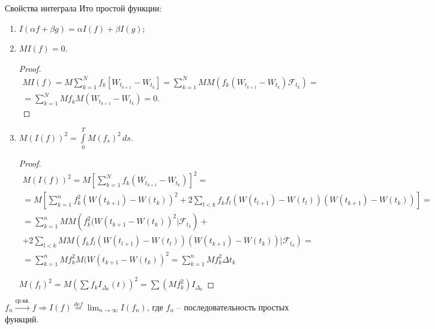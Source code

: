 Свойства интеграла Ито простой функции:
\begin{enumerate}
  \item $I(\alpha f + \beta g) = \alpha I(f) + \beta I(g)$;
  \item $MI(f) = 0$.
    \begin{proof}
      \begin{multline*}
        MI(f) = M \sum_{k=1}^N f_k [W_{t_{k+1}} - W_{t_k}] =
        \sum_{k=1}^N M M \left( f_k (W_{t_{k+1}} - W_{t_k}) \mathcal{F}_{t_k} \right) = \\
        = \sum_{k=1}^N M f_k M \left( W_{t_{k+1}} - W_{t_k} \right) = 0.
      \end{multline*}
    \end{proof}
  \item $M \left( I(f) \right)^2 = \int\limits_0^T M (f_s)^2 \, ds$.
    \begin{proof}
      \begin{multline*}
        M (I(f))^2 = M \left[ \sum_{k=1}^N f_k \left( W_{t_{k+1}} - W_{t_k} \right) \right]^2 = \\
        = M \left[ \sum_{k=1}^n f_k^2 \left( W(t_{k+1}) - W(t_k) \right)^2 +
        2 \sum_{l < k} f_k f_l \left( W(t_{l+1})-W(t_l) \right) \left( W(t_{k+1})-W(t_k) \right)  \right] = \\
        = \sum_{k=1}^n MM \left( f_k^2 (W(t_{k+1}-W(t_k))^2 | \mathcal{F}_{t_k} \right) + \\
        +2 \sum_{l<k} MM \left( f_k f_l \left( W(t_{l+1})-W(t_l) \right) \left( W(t_{k+1})-W(t_k) \right) | \mathcal{F}_{t_k} \right) = \\
        = \sum_{k=1}^n M f_k^2 M(W(t_{k+1}-W(t_k))^2 =
        \sum_{k=1}^n M f_k^2 \Delta t_k
      \end{multline*}

      $M(f_t)^2 = M\left( \sum f_k I_{\Delta_k}(t) \right)^2 = \sum (Mf_k^2) I_{\Delta_k}$

    \end{proof}
\end{enumerate}

$f_n \overset{\text{ср.кв.}}{\rightarrow} f \Rightarrow I(f) \overset{def}{=} \lim_{n\to\infty} I(f_n)$, где $f_n$ -- последовательность простых функций.

